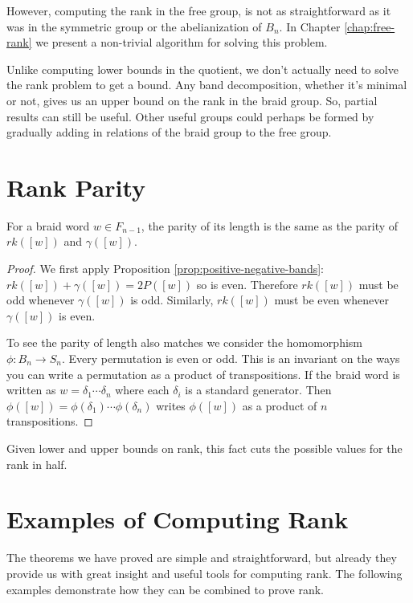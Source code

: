 \documentclass[12pt]{thesis}
\begin{document}
However, computing the rank in the free group, is not as straightforward
as it was in the symmetric group or the abelianization of $B_{n}$.
In Chapter \ref{chap:free-rank} we
present a non-trivial algorithm for solving this problem.

Unlike computing lower bounds in the quotient,
we don't actually need to solve the rank problem to get a bound.
Any band decomposition, whether it's minimal or not, gives
us an upper bound on the rank in the braid group.
So, partial results can still be useful.
Other useful groups could perhaps be
formed by gradually adding in relations of the braid group 
to the free group.

\section{Rank Parity}

\begin{corollary}
    \label{cor:rank-parity}
    For a braid word $w \in F_{n-1}$,
    the parity of its length
    is the same as the parity of $rk([w])$ and $\gamma([w])$.
\end{corollary}

\begin{proof}
    We first apply Proposition \ref{prop:positive-negative-bands}:
    $rk([w]) + \gamma([w]) = 2P([w])$ so is even.
    Therefore $rk([w])$ must be odd whenever $\gamma([w])$ is odd.
    Similarly, $rk([w])$ must be even whenever $\gamma([w])$ is even.


    To see the parity of length also matches
    we consider the homomorphism $\phi \colon B_{n} \rightarrow S_{n}$.
    Every permutation is even or odd.
    This is an invariant on the ways you can write a
    permutation as a product of transpositions.
    If the braid word is written as $w = \delta_{1} \cdots \delta_{n}$
    where each $\delta_{i}$ is a standard generator.
    Then $\phi([w]) = \phi(\delta_{1}) \cdots \phi(\delta_{n})$ 
    writes $\phi([w])$ as a product of $n$ transpositions.
\end{proof}

Given lower and upper bounds on rank,
this fact cuts the possible values for the rank in half.

\section{Examples of Computing Rank}

The theorems we have proved are simple and straightforward,
but already they provide us with great
insight and useful tools for computing rank.
The following examples demonstrate how they
can be combined to prove rank.
\end{document}
